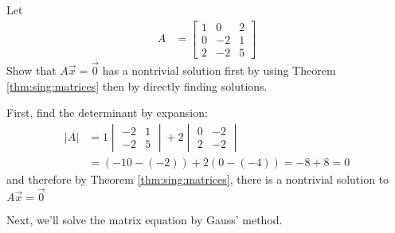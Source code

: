 \begin{example}
Let 
%
\begin{align*}
A & = \begin{bmatrix}
1 & 0 & 2 \\
0 & -2 & 1 \\
2 & -2 & 5 
\end{bmatrix}
\end{align*}
Show that $A\vec{x} = \vec{0}$ has a nontrivial solution first by using Theorem \ref{thm:sing:matrices} then by directly finding solutions.  

\solution

First, find the determinant by expansion:
%
\begin{align*}
|A| & = 1 \begin{vmatrix}
-2 & 1 \\ -2 & 5 
\end{vmatrix} + 2 \begin{vmatrix}
0 & -2 \\ 2 & -2 
\end{vmatrix} \\
& = (-10-(-2)) + 2 (0-(-4)) = -8 + 8 = 0 
\end{align*}
and therefore by Theorem \ref{thm:sing:matrices}, there is a nontrivial solution to $A \vec{x} = \vec{0}$

Next, we'll solve the matrix equation by Gauss' method. 


\end{example}
